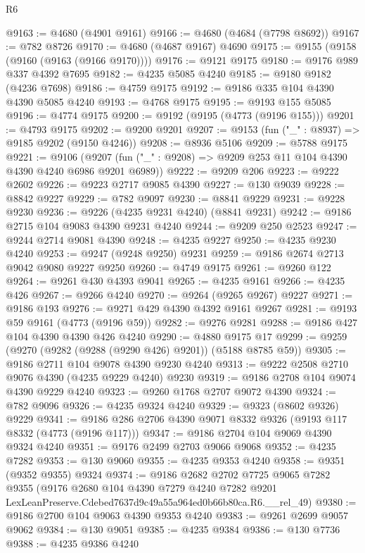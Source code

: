 \begin{lexlean}{R6}
\begin{coremodule}
@9163 := @4680 (@4901 @9161)
@9166 := @4680 (@4684 (@7798 @8692))
@9167 := @782 @8726
@9170 := @4680 (@4687 @9167) @4690
@9175 := @9155 (@9158 (@9160 (@9163 (@9166 @9170))))
@9176 := @9121 @9175
@9180 := @9176 @989 @337 @4392 @7695
@9182 := @4235 @5085 @4240
@9185 := @9180 @9182 (@4236 @7698)
@9186 := @4759 @9175
@9192 := @9186 @335 @104 @4390 @4390 @5085 @4240
@9193 := @4768 @9175
@9195 := @9193 @155 @5085
@9196 := @4774 @9175
@9200 := @9192 (@9195 (@4773 (@9196 @155)))
@9201 := @4793 @9175
@9202 := @9200 @9201
@9207 := @9153 (fun ("_" : @8937) => @9185 @9202 (@9150 @4246))
@9208 := @8936 @5106
@9209 := @5788 @9175
@9221 := @9106
    (@9207 (fun ("_" : @9208) => @9209 @253 @11 @104 @4390 @4390 @4240 @6986 @9201 @6989))
@9222 := @9209 @206
@9223 := @9222 @2602
@9226 := @9223 @2717 @9085 @4390
@9227 := @130 @9039
@9228 := @8842 @9227
@9229 := @782 @9097
@9230 := @8841 @9229
@9231 := @9228 @9230
@9236 := @9226 (@4235 @9231 @4240) (@8841 @9231)
@9242 := @9186 @2715 @104 @9083 @4390 @9231 @4240
@9244 := @9209 @250 @2523
@9247 := @9244 @2714 @9081 @4390
@9248 := @4235 @9227
@9250 := @4235 @9230 @4240
@9253 := @9247 (@9248 @9250) @9231
@9259 := @9186 @2674 @2713 @9042 @9080 @9227 @9250
@9260 := @4749 @9175
@9261 := @9260 @122
@9264 := @9261 @430 @4393 @9041
@9265 := @4235 @9161
@9266 := @4235 @426
@9267 := @9266 @4240
@9270 := @9264 (@9265 @9267) @9227
@9271 := @9186 @193
@9276 := @9271 @429 @4390 @4392 @9161 @9267
@9281 := @9193 @59 @9161 (@4773 (@9196 @59))
@9282 := @9276 @9281
@9288 := @9186 @427 @104 @4390 @4390 @426 @4240
@9290 := @4880 @9175 @17
@9299 := @9259 (@9270 (@9282 (@9288 (@9290 @426) @9201)) (@5188 @8785 @59))
@9305 := @9186 @2711 @104 @9078 @4390 @9230 @4240
@9313 := @9222 @2508 @2710 @9076 @4390 (@4235 @9229 @4240) @9230
@9319 := @9186 @2708 @104 @9074 @4390 @9229 @4240
@9323 := @9260 @1768 @2707 @9072 @4390
@9324 := @782 @9096
@9326 := @4235 @9324 @4240
@9329 := @9323 (@8602 @9326) @9229
@9341 := @9186 @286 @2706 @4390 @9071 @8332 @9326 (@9193 @117 @8332 (@4773 (@9196 @117)))
@9347 := @9186 @2704 @104 @9069 @4390 @9324 @4240
@9351 := @9176 @2499 @2703 @9066 @9068
@9352 := @4235 @7282
@9353 := @130 @9060
@9355 := @4235 @9353 @4240
@9358 := @9351 (@9352 @9355) @9324
@9374 := @9186
    @2682
    @2702
    @7725
    @9065
    @7282
    @9355
    (@9176
      @2680
      @104
      @4390
      @7279
      @4240
      @7282
      @9201
      LexLeanPreserve.Cdebed7637d9c49a55a964ed0b66b80ca.R6.__rel_49)
@9380 := @9186 @2700 @104 @9063 @4390 @9353 @4240
@9383 := @9261 @2699 @9057 @9062
@9384 := @130 @9051
@9385 := @4235 @9384
@9386 := @130 @7736
@9388 := @4235 @9386 @4240

\end{coremodule}
\end{lexlean}
